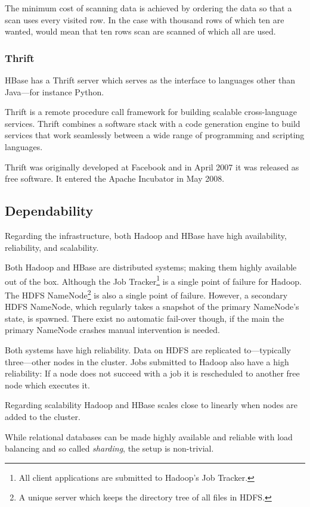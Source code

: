 The minimum cost of scanning data is achieved by ordering the data so that
a scan uses every visited row. In the case with thousand rows of which ten
are wanted, would mean that ten rows scan are scanned of which all are
used.


\subsubsection{Thrift}

HBase has a Thrift server which serves as the interface to languages other than
Java---for instance Python.

Thrift is a remote procedure call framework for building scalable cross-language
services. Thrift combines a software stack with a code generation engine to
build services that work seamlessly between a wide range of programming and
scripting languages. \cite{thrift}

Thrift was originally developed at Facebook and in April 2007 it was released as
free software. It entered the Apache Incubator in May 2008.


\subsection{Dependability}

Regarding the infrastructure, both Hadoop and HBase have high availability,
reliability, and scalability.

Both Hadoop and HBase are distributed systems; making them highly available out
of the box. Although the Job Tracker\footnote{All client applications are
submitted to Hadoop's Job Tracker.} is a single point of failure for Hadoop.
The HDFS NameNode\footnote{A unique server which keeps the directory tree of all
files in HDFS.} is also a single point of failure. However, a secondary HDFS
NameNode, which regularly takes a snapshot of the primary NameNode's state, is
spawned. There exist no automatic fail-over though, if the main the primary
NameNode crashes manual intervention is needed.

Both systems have high reliability. Data on HDFS are replicated to---typically
three---other nodes in the cluster. Jobs submitted to Hadoop also have a high
reliability: If a node does not succeed with a job it is rescheduled to another
free node which executes it.

Regarding scalability Hadoop and HBase scales close to linearly when nodes are
added to the cluster.

While relational databases can be made highly available and reliable with load
balancing and so called \textit{sharding}, the setup is non-trivial.



